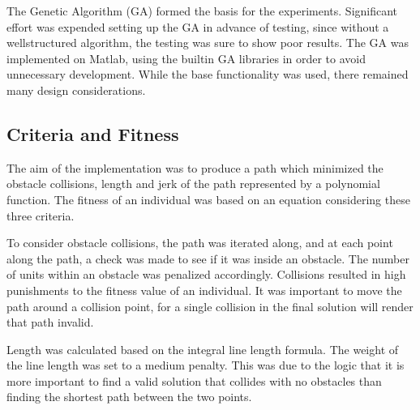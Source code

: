 	
		
			
		
%
The Genetic Algorithm (GA) formed the basis for the experiments. Significant effort was expended setting up the GA in advance of testing, since without a well\-structured algorithm, the testing was sure to show poor results. The GA was implemented on Matlab, using the built\-in GA libraries in order to avoid unnecessary development. While the base functionality was used, there remained many design considerations.

\subsection{Criteria and Fitness}
The aim of the implementation was to produce a path which minimized the obstacle collisions, length and jerk of the path represented by a polynomial function. The fitness of an individual was based on an equation considering these three criteria.

To consider obstacle collisions, the path was iterated along, and at each point along the path, a check was made to see if it was inside an obstacle. The number of units within an obstacle was penalized accordingly. Collisions resulted in high punishments to the fitness value of an individual. It was important to move the path around a collision point, for a single collision in the final solution will render that path invalid.

Length was calculated based on the integral line length formula. The weight of the line length was set to a medium penalty. This was due to the logic that it is more important to find a valid solution that collides with no obstacles than finding the shortest path between the two points.

